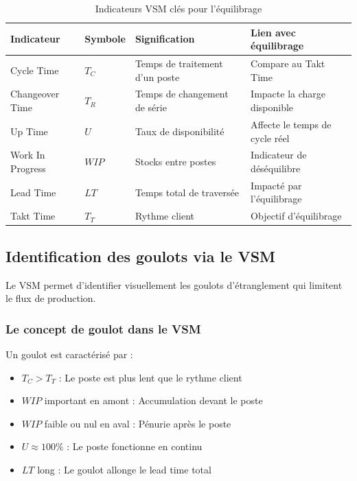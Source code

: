 \documentclass[12pt,a4paper]{article}
\newenvironment{methodbox}[1]
  {\begin{tcolorbox}[colback=blue!5!white, colframe=methodcolor, title=#1]\small}
  {\end{tcolorbox}}
\begin{document}
\begin{table}[H]
\centering
\begin{tabular}{|p{3cm}|p{3cm}|p{4cm}|p{3cm}|}
\hline
\textbf{Indicateur} & \textbf{Symbole} & \textbf{Signification} & \textbf{Lien avec équilibrage} \\
\hline
Cycle Time & $T_C$ & Temps de traitement d'un poste & Compare au Takt Time \\
\hline
Changeover Time & $T_R$ & Temps de changement de série & Impacte la charge disponible \\
\hline
Up Time & $U$ & Taux de disponibilité & Affecte le temps de cycle réel \\
\hline
Work In Progress & $WIP$ & Stocks entre postes & Indicateur de déséquilibre \\
\hline
Lead Time & $LT$ & Temps total de traversée & Impacté par l'équilibrage \\
\hline
Takt Time & $T_T$ & Rythme client & Objectif d'équilibrage \\
\hline
\end{tabular}
\caption{Indicateurs VSM clés pour l'équilibrage}
\end{table}

\subsection{Identification des goulots via le VSM}

Le VSM permet d'identifier visuellement les goulots d'étranglement qui limitent le flux de production.

\subsubsection{Le concept de goulot dans le VSM}

Un goulot est caractérisé par :

\begin{methodbox}{Signes d'un goulot dans le VSM}
\begin{itemize}
    \item $T_C > T_T$ : Le poste est plus lent que le rythme client
    \item $WIP$ important en amont : Accumulation devant le poste
    \item $WIP$ faible ou nul en aval : Pénurie après le poste
    \item $U \approx 100\%$ : Le poste fonctionne en continu
    \item $LT$ long : Le goulot allonge le lead time total
\end{itemize}
\end{methodbox}
\end{document}
